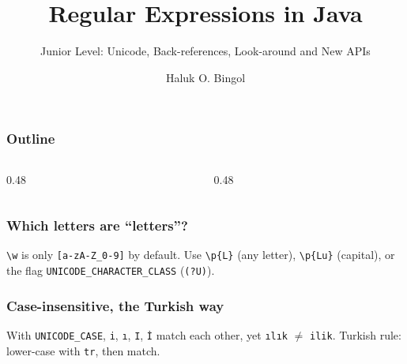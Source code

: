 \documentclass[aspectratio=169,10pt,compress]{beamer}
\title{Regular Expressions in Java}
\subtitle{Junior Level: Unicode, Back-references, Look-around and New APIs}
\author[Bingol]{Haluk O. Bingol}
\institute[FCIS]{
    Faculty of Computer and Information Sciences\\
    Yeditepe University
}
\date{
	{\tiny \hbTimeStamp}
}
\begin{document}
\begin{frame}[t,fragile]
  \titlepage
\end{frame}




\begin{frame}[t,fragile] \frametitle{Outline}
  \begin{columns}[T]
    \begin{column}{0.48\textwidth}
      \tableofcontents[sections={1-4}, hideallsubsections]
    \end{column}
    \begin{column}{0.48\textwidth}
      \tableofcontents[sections={5-8}, hideallsubsections]
    \end{column}
  \end{columns}
\end{frame}





\begin{frame}[t,fragile] \frametitle{Which letters are ``letters''?}

  \vspace{0.2em}
  \small \texttt{\textbackslash w} is only \texttt{[a-zA-Z\_0-9]} by default. Use \texttt{\textbackslash p\{L\}} (any letter), \texttt{\textbackslash p\{Lu\}} (capital), or the flag \texttt{UNICODE\_CHARACTER\_CLASS} (\texttt{(?U)}).
\end{frame}




\begin{frame}[t,fragile] \frametitle{Case-insensitive, the Turkish way}

  \vspace{0.2em}
  \small With \texttt{UNICODE\_CASE}, \texttt{i}, \texttt{ı}, \texttt{I}, \texttt{İ} match each other, yet \texttt{ılık} $\neq$ \texttt{ilik}. Turkish rule: lower-case with \texttt{tr}, then match.
\end{frame}
\end{document}
